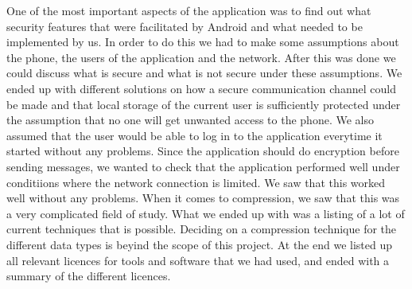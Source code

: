 \newline\newline
One of the most important aspects of the application was to find out what security features that were facilitated by Android and what needed to be implemented by us. In order to do this we had to make some assumptions about the phone, the users of the application and the network. After this was done we could discuss what is secure and what is not secure under these assumptions. We ended up with different solutions on how a secure communication channel could be made and that local storage of the current user is sufficiently protected under the assumption that no one will get unwanted access to the phone. We also assumed that the user would be able to log in to the application everytime it started without any problems.
\newline\newline
Since the application should do encryption before sending messages, we wanted to check that the application performed well under conditiions where the network connection is limited. We saw that this worked well without any problems.
\newline
\newline
When it comes to compression, we saw that this was a very complicated field of study. What we ended up with was a listing of a lot of current techniques that is possible. Deciding on a compression technique for the different data types is beyind the scope of this project.
\newline\newline
At the end we listed up all relevant licences for tools and software that we had used, and ended with a summary of the different licences.
